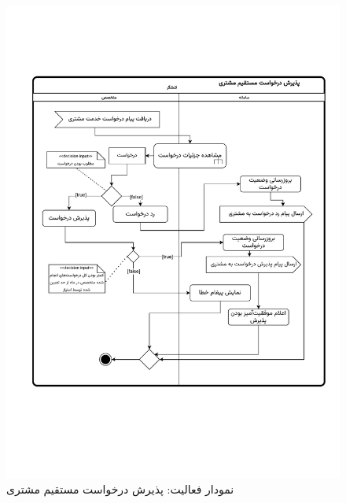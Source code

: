 \begin{figure}[ht!]
	\centering
	\includegraphics[scale=0.8, page=1]{figs/OOD-activity-directaccept.pdf}
	\caption{نمودار فعالیت: پذیرش درخواست مستقیم مشتری}
\end{figure}
\FloatBarrier
\newpage

